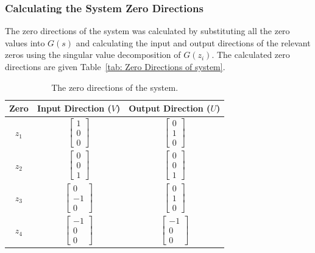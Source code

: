 \subsubsection{Calculating the System Zero Directions}

The zero directions of the system was calculated by substituting all the zero values into $G(s)$ and calculating the input and output directions of the relevant zeros using the singular value decomposition of $G(z_i)$. The calculated zero directions are given Table~\ref{tab: Zero Directions of system}.

\begin{table}[H]
	\centering
	\caption{The zero directions of the system.}
	\begin{tabular}{ccc}
		\hline
		\textbf{Zero} & \textbf{Input Direction ($V$)} & \textbf{Output Direction ($U$)} \\\hline
		$z_1$            &$ \begin{bmatrix} 1 \\ 0 \\ 0\end{bmatrix} $ & $ \begin{bmatrix} 0 \\ 1 \\ 0\end{bmatrix} $ \\
		$z_2$            &$ \begin{bmatrix} 0 \\ 0 \\ 1\end{bmatrix} $ & $ \begin{bmatrix} 0 \\ 0 \\ 1\end{bmatrix} $ \\
		$z_3$            &$ \begin{bmatrix} 0 \\ -1 \\ 0\end{bmatrix} $ & $ \begin{bmatrix} 0 \\ 1 \\ 0\end{bmatrix} $ \\
		$z_4$            &$ \begin{bmatrix} -1 \\ 0 \\ 0\end{bmatrix} $ & $ \begin{bmatrix} -1 \\ 0 \\ 0\end{bmatrix} $ \\

\end{tabular}
\end{table}
